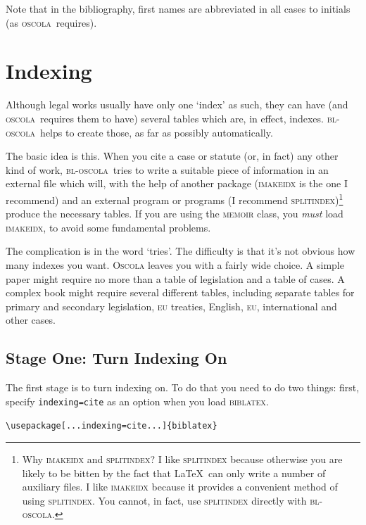 \documentclass[a4paper,
               11pt,
	       DIV=1,			   
	       footinclude=false]
	      {scrartcl}
\newcommand{\oscola}{\textsc{bl-oscola}}
\newcommand{\biblatex}{\textsc{biblatex}}
\newcommand{\oscolashort}{\textsc{oscola}\nocite{oscola}}
\begin{document}
Note that in the bibliography, first names are abbreviated in all cases to initials (as \oscolashort\ requires).

\section{Indexing\label{indexing}}

Although legal works usually have only one `index' as such, they can
have (and \oscolashort\ requires them to have) several
tables which are, in effect, indexes. \oscola\ helps to create those,
as far as possibly automatically.

The basic idea is this. When you cite a case or statute (or, in fact)
any other kind of work, \oscola\ tries to write a suitable piece of
information in an external file which will, with the help of another
package (\textsc{imakeidx} is the one I recommend) and an external
program or programs (I recommend \textsc{splitindex})\footnote{Why
\textsc{imakeidx} and \textsc{splitindex}? I like \textsc{splitindex}
because otherwise you are likely to be bitten by the fact that \LaTeX\
can only write a number of auxiliary files. I like \textsc{imakeidx}
because it provides a convenient method of using
\textsc{splitindex}. You cannot, in fact, use \textsc{splitindex}
directly with \oscola.} produce the necessary tables. If you are using the
\textsc{memoir} class, you \emph{must} load \textsc{imakeidx}, to avoid some
fundamental problems.

The complication is in the word `tries'. The difficulty is that it's
not obvious how many indexes you want. \textsc{Oscola} leaves you
with a fairly wide choice. A simple paper might require no more than a
table of legislation and a table of cases. A complex book might
require several different tables, including separate tables for
primary and secondary legislation, \textsc{eu} treaties, English,
\textsc{eu}, international and other cases. 

\subsection{Stage One: Turn Indexing On}

The first stage is to turn indexing on. To do that you need to do two
things: first, specify \texttt{indexing=cite} as an option when you
load \biblatex.
\begin{center}
\verb|\usepackage[...indexing=cite...]{biblatex}|
\end{center}
\end{document}
